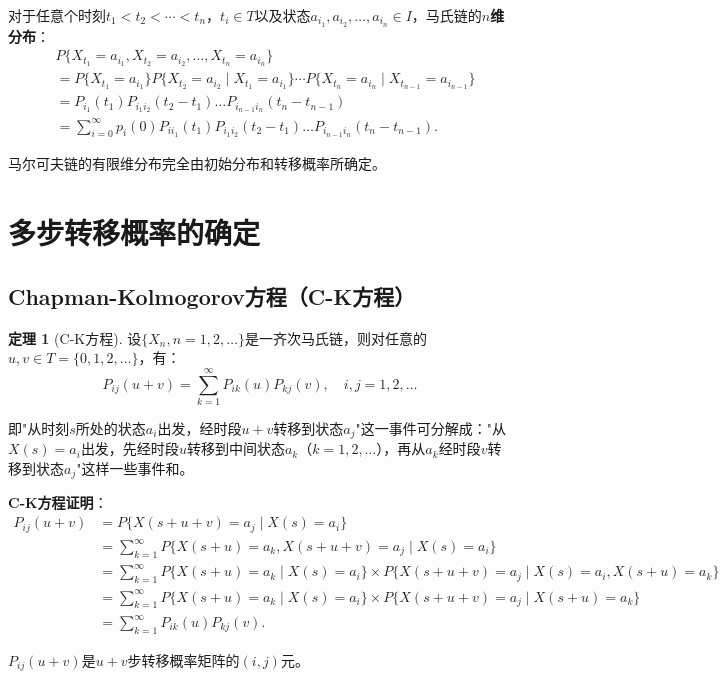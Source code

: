 \documentclass[11pt,a4paper]{report}
\theoremstyle{definition}
\newtheorem{theorem}{定理}[chapter]
\begin{document}
对于任意个时刻$t_1<t_2<\cdots<t_n$，$t_i\in T$以及状态$a_{i_1},a_{i_2},\ldots,a_{i_n}\in I$，马氏链的\textbf{$n$维分布}：
\begin{align*}
&P\{X_{t_1}=a_{i_1},X_{t_2}=a_{i_2},\ldots,X_{t_n}=a_{i_n}\}\\
&=P\{X_{t_1}=a_{i_1}\}P\{X_{t_2}=a_{i_2}\mid X_{t_1}=a_{i_1}\}\cdots P\{X_{t_n}=a_{i_n}\mid X_{t_{n-1}}=a_{i_{n-1}}\}\\
&=P_{i_1}(t_1)P_{i_1i_2}(t_2-t_1)\ldots P_{i_{n-1}i_n}(t_n-t_{n-1})\\
&=\sum_{i=0}^{\infty}p_i(0)P_{ii_1}(t_1)P_{i_1i_2}(t_2-t_1)\ldots P_{i_{n-1}i_n}(t_n-t_{n-1}).
\end{align*}

马尔可夫链的有限维分布完全由初始分布和转移概率所确定。

\section{多步转移概率的确定}

\subsection{Chapman-Kolmogorov方程（C-K方程）}

\begin{theorem}[C-K方程]
设$\{X_n,n=1,2,\ldots\}$是一齐次马氏链，则对任意的$u,v\in T=\{0,1,2,\ldots\}$，有：
\[
P_{ij}(u+v)=\sum_{k=1}^{\infty}P_{ik}(u)P_{kj}(v),\quad i,j=1,2,\ldots
\]
\end{theorem}

即"从时刻$s$所处的状态$a_i$出发，经时段$u+v$转移到状态$a_j$"这一事件可分解成："从$X(s)=a_i$出发，先经时段$u$转移到中间状态$a_k$（$k=1,2,\ldots$），再从$a_k$经时段$v$转移到状态$a_j$"这样一些事件和。

\textbf{C-K方程证明}：
\begin{align*}
P_{ij}(u+v)&=P\{X(s+u+v)=a_j\mid X(s)=a_i\}\\
&=\sum_{k=1}^{\infty}P\{X(s+u)=a_k,X(s+u+v)=a_j\mid X(s)=a_i\}\\
&=\sum_{k=1}^{\infty}P\{X(s+u)=a_k\mid X(s)=a_i\}\times P\{X(s+u+v)=a_j\mid X(s)=a_i,X(s+u)=a_k\}\\
&=\sum_{k=1}^{\infty}P\{X(s+u)=a_k\mid X(s)=a_i\}\times P\{X(s+u+v)=a_j\mid X(s+u)=a_k\}\\
&=\sum_{k=1}^{\infty}P_{ik}(u)P_{kj}(v).
\end{align*}

$P_{ij}(u+v)$是$u+v$步转移概率矩阵的$(i,j)$元。
\end{document}
